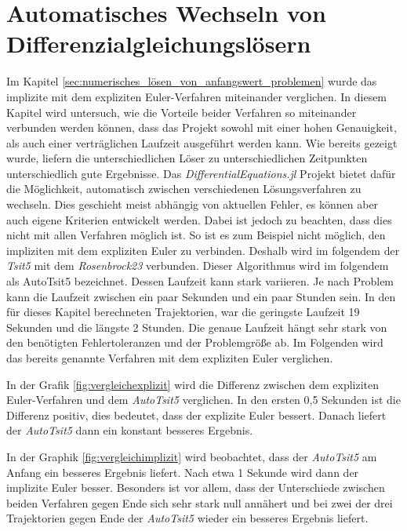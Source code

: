 

\section{Automatisches Wechseln von Differenzialgleichungslösern}

Im Kapitel \ref{sec:numerisches_lösen_von_anfangswert_problemen} wurde das implizite mit dem expliziten Euler-Verfahren miteinander verglichen.
In diesem Kapitel wird untersuch, wie die Vorteile beider Verfahren so miteinander verbunden 
werden können, dass das Projekt sowohl mit einer hohen Genauigkeit, als auch einer verträglichen Laufzeit
ausgeführt werden kann.
Wie bereits gezeigt wurde, liefern die unterschiedlichen Löser zu unterschiedlichen Zeitpunkten
unterschiedlich gute Ergebnisse.
Das \textit{DifferentialEquations.jl} Projekt bietet dafür die Möglichkeit, automatisch 
zwischen verschiedenen Lösungsverfahren zu wechseln.
Dies geschieht meist abhängig von aktuellen Fehler, es können aber auch eigene Kriterien entwickelt werden.
Dabei ist jedoch zu beachten, dass dies nicht mit allen Verfahren möglich ist.
So ist es zum Beispiel nicht möglich, den impliziten mit dem expliziten Euler zu verbinden.
Deshalb wird im folgendem der \textit{Tsit5} mit dem \textit{Rosenbrock23} verbunden. Dieser Algorithmus wird im folgendem als AutoTsit5 bezeichnet.
Dessen Laufzeit kann stark variieren. Je nach Problem kann die Laufzeit zwischen ein paar Sekunden und
ein paar Stunden sein.
In den für dieses Kapitel berechneten Trajektorien, war die geringste Laufzeit 19 Sekunden und die längste 2 Stunden.
Die genaue Laufzeit hängt sehr stark von den benötigten Fehlertoleranzen und der Problemgröße ab.
Im Folgenden wird das bereits genannte Verfahren mit dem expliziten Euler verglichen.

In der Grafik \ref{fig:vergleichexplizit} wird die Differenz zwischen dem expliziten Euler-Verfahren und dem \textit{AutoTsit5} verglichen.
In den ersten 0,5 Sekunden ist die Differenz positiv, dies bedeutet, dass
der explizite Euler bessert.
Danach liefert der \textit{AutoTsit5} dann ein konstant besseres Ergebnis.

In der Graphik \ref{fig:vergleichimplizit} wird beobachtet,
dass der \textit{AutoTsit5} am Anfang ein besseres Ergebnis liefert.
Nach etwa 1 Sekunde wird dann der implizite Euler besser.
Besonders ist vor allem, dass der Unterschiede zwischen beiden Verfahren gegen Ende sich sehr stark null annähert und bei zwei der drei Trajektorien gegen Ende  der \textit{AutoTsit5} wieder ein besseres Ergebnis liefert.

